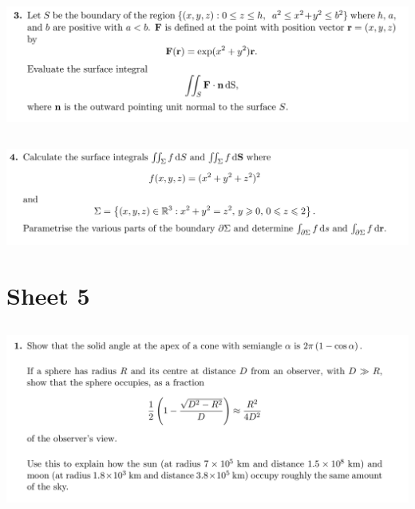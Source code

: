\documentclass[12pt]{article}
\begin{document}
\subsection{}
\begin{mdframed}
  \includegraphics[width=400pt]{img/oxford-prelims-M5-multivariable-calc-4-3.png}
\end{mdframed}

\subsection{}
\begin{mdframed}
  \includegraphics[width=400pt]{img/oxford-prelims-M5-multivariable-calc-4-4.png}
\end{mdframed}

\newpage
\section{Sheet 5}

\subsection{}
\begin{mdframed}
  \includegraphics[width=400pt]{img/oxford-prelims-M5-multivariable-calc-5-1.png}
\end{mdframed}
\end{document}
